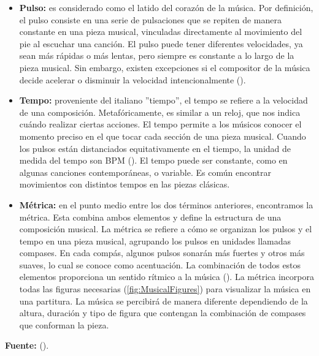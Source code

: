 \begin{itemize}
	\item \textbf{Pulso:} es considerado como el latido del corazón de la música. Por definición, el pulso consiste en una serie de pulsaciones que se repiten de manera constante en una pieza musical, vinculadas directamente al movimiento del pie al escuchar una canción. El pulso puede tener diferentes velocidades, ya sean más rápidas o más lentas, pero siempre es constante a lo largo de la pieza musical. Sin embargo, existen excepciones si el compositor de la música decide acelerar o disminuir la velocidad intencionalmente (\cite{VIOLÍNZN:2024}).
	\item \textbf{Tempo:} proveniente del italiano ''tiempo'', el tempo se refiere a la velocidad de una composición. Metafóricamente, es similar a un reloj, que nos indica cuándo realizar ciertas acciones. El tempo permite a los músicos conocer el momento preciso en el que tocar cada sección de una pieza musical. Cuando los pulsos están distanciados equitativamente en el tiempo, la unidad de medida del tempo son BPM (\cite{MASTEREDBLOGS:2021}). El tempo puede ser constante, como en algunas canciones contemporáneas, o variable. Es común encontrar movimientos con distintos tempos en las piezas clásicas.
	\item \textbf{Métrica:} en el punto medio entre los dos términos anteriores, encontramos la métrica. Esta combina ambos elementos y define la estructura de una composición musical. La métrica se refiere a cómo se organizan los pulsos y el tempo en una pieza musical, agrupando los pulsos en unidades llamadas compases. En cada compás, algunos pulsos sonarán más fuertes y otros más suaves, lo cual se conoce como acentuación. La combinación de todos estos elementos proporciona un sentido rítmico a la música (\cite{COMPOMUSICAL:2024}). La métrica incorpora todas las figuras necesarias (\autoref{fig:MusicalFigures}) para visualizar la música en una partitura. La música se percibirá de manera diferente dependiendo de la altura, duración y tipo de figura que contengan la combinación de compases que conforman la pieza.
\end{itemize}

\begin{center}
	\textbf{Fuente:} \citeauthor{VIOLÍNZN:2024} (\citeyear{VIOLÍNZN:2024}).
	\vspace{-18pt}
\end{center}

